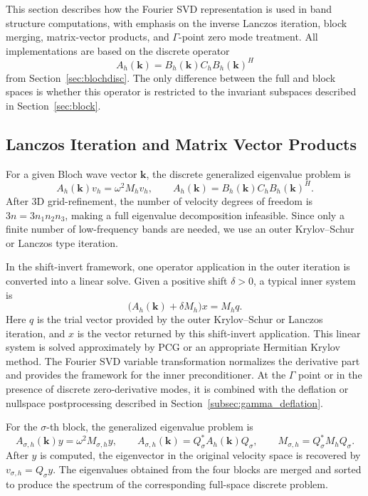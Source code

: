 \documentclass[11pt,oneside]{article}
\numberwithin{equation}{section}
\theoremstyle{plain}
\theoremstyle{remark}
\newcommand{\bk}{\bm{k}}
\begin{document}
This section describes how the Fourier SVD representation is used in band structure computations, with emphasis on the inverse Lanczos iteration, block merging, matrix-vector products, and \(\Gamma\)-point zero mode treatment. All implementations are based on the discrete operator
\[
A_h(\bk)=B_h(\bk)C_hB_h(\bk)^H
\]
from Section~\ref{sec:blochdisc}. The only difference between the full and block spaces is whether this operator is restricted to the invariant subspaces described in Section~\ref{sec:block}.

\subsection{Lanczos Iteration and Matrix Vector Products}

For a given Bloch wave vector \(\bk\), the discrete generalized eigenvalue problem is
\begin{equation}\label{eq:impl_gep_unified}
A_h(\bk)v_h=\omega^2M_hv_h,
\qquad
A_h(\bk)=B_h(\bk)C_hB_h(\bk)^H.
\end{equation}
After 3D grid-refinement, the number of velocity degrees of freedom is \(3n=3n_1n_2n_3\), making a full eigenvalue decomposition infeasible. Since only a finite number of low-frequency bands are needed, we use an outer Krylov--Schur or Lanczos type iteration.

In the shift-invert framework, one operator application in the outer iteration is converted into a linear solve. Given a positive shift \(\delta>0\), a typical inner system is
\begin{equation}\label{eq:shift_invert_system_unified}
\bigl(A_h(\bk)+\delta M_h\bigr)x=M_hq.
\end{equation}
Here \(q\) is the trial vector provided by the outer Krylov--Schur or Lanczos iteration, and \(x\) is the vector returned by this shift-invert application. This linear system is solved approximately by PCG or an appropriate Hermitian Krylov method. The Fourier SVD variable transformation normalizes the derivative part and provides the framework for the inner preconditioner. At the \(\Gamma\) point or in the presence of discrete zero-derivative modes, it is combined with the deflation or nullspace postprocessing described in Section~\ref{subsec:gamma_deflation}.

For the \(\sigma\)-th block, the generalized eigenvalue problem is
\begin{equation}\label{eq:block_gep_impl_unified}
A_{\sigma,h}(\bk)y=\omega^2M_{\sigma,h}y,
\qquad
A_{\sigma,h}(\bk)=Q_\sigma^*A_h(\bk)Q_\sigma,
\qquad
M_{\sigma,h}=Q_\sigma^*M_hQ_\sigma.
\end{equation}
After \(y\) is computed, the eigenvector in the original velocity space is recovered by \(v_{\sigma,h}=Q_\sigma y\). The eigenvalues obtained from the four blocks are merged and sorted to produce the spectrum of the corresponding full-space discrete problem.
\end{document}
